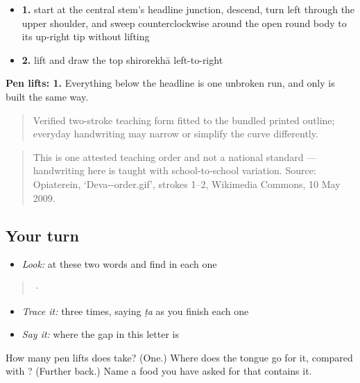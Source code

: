 \begin{itemize}
\raggedright
  \item \textbf{1.} start at the central stem's headline junction, descend, turn left through the upper shoulder, and sweep counterclockwise around the open round body to its up-right tip without lifting
  \item \textbf{2.} lift and draw the top shirorekhā left-to-right
\end{itemize}

\textbf{Pen lifts: 1.} Everything below the headline is one unbroken run, and only \textbf{} is built the same way.

\begin{quote}
Verified two-stroke teaching form fitted to the bundled printed outline; everyday handwriting may narrow or simplify the curve differently.
\end{quote}

\begin{quote}
This is one attested teaching order and not a national standard — handwriting here is taught with school-to-school variation. Source: Opiaterein, ‘Deva--order.gif’, strokes 1–2, Wikimedia Commons, 10 May 2009.
\end{quote}

\subsection*{Your turn}
\begin{itemize}
\raggedright
  \item \emph{Look:} at these two words and find  in each one
\end{itemize}

\begin{quote}
  ·  
\end{quote}

\begin{itemize}
\raggedright
  \item \emph{Trace it:}  three times, saying \emph{ṭa} as you finish each one
  \item \emph{Say it:} where the gap in this letter is
\end{itemize}

\begin{tcolorbox}[breakable,colback=teal!4,colframe=teal!35!black,title={Before you move on}]
How many pen lifts does \textbf{} take? (One.) Where does the tongue go for it, compared with \textbf{}? (Further back.) Name a food you have asked for that contains it.
\end{tcolorbox}
